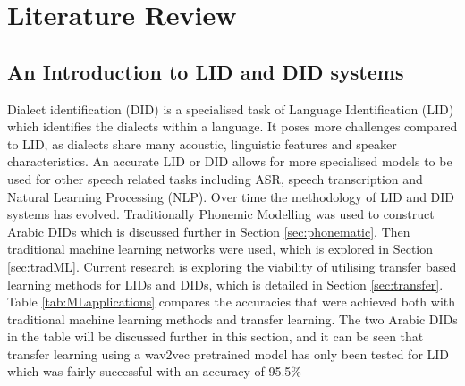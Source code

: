 \chapter{Literature Review}\label{ch:litreview}
\section{An Introduction to LID and DID systems}
Dialect identification (DID) is a specialised task of Language Identification (LID)
which identifies the dialects within a language. It poses more challenges compared to LID, 
as dialects share many acoustic, linguistic features and speaker characteristics. An accurate LID 
or DID allows for more specialised models to be used for other speech related tasks including ASR, speech transcription and 
Natural Learning Processing (NLP).
Over time the methodology of LID and DID systems has evolved. 
Traditionally Phonemic Modelling was used to construct Arabic DIDs which is discussed further in Section
\ref{sec:phonematic}. Then traditional machine learning networks were used, which is explored in Section 
\ref{sec:tradML}. Current research is exploring the viability of utilising transfer based learning methods 
for LIDs and DIDs, which is detailed in Section \ref{sec:transfer}. Table \ref{tab:MLapplications} compares 
the accuracies that were achieved both with traditional machine learning methods and transfer learning. The two Arabic DIDs in the table will be discussed 
further in this section, and it can be seen 
that transfer learning using a wav2vec pretrained model has only been tested for LID which was fairly successful with an accuracy of 95.5\%


